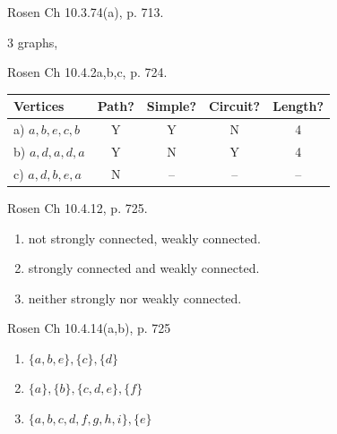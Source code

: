 \begin{questions}
\begin{solution}
    \end{solution}




 Rosen Ch 10.3.74(a), p. 713.
    \ifprintanswers
        \vspace{-10pt}
    \fi
    \begin{solution}
        3 graphs, 
    \end{solution}



 Rosen Ch 10.4.2a,b,c, p. 724.
   \ifprintanswers
        \vspace{-15pt}
   \fi
    \begin{solution}
    \begin{tabular}{lcccc}
        Vertices & Path? & Simple? & Circuit? & Length? \\
        \hline
        a) $a,b,e,c,b$     & Y & Y & N & 4 \\
        b) $a,d,a,d,a$     & Y & N & Y & 4 \\
        c) $a,d,b,e,a$     & N & -- & -- & -- \\
        \hline
    \end{tabular}
    \end{solution}



 Rosen Ch 10.4.12, p. 725.
   \ifprintanswers
        \vspace{-15pt}
   \fi
    \begin{solution}
    \begin{enumerate}[label=(\alph*), topsep=0pt, itemsep=0pt, parsep=0pt]
        \item not strongly connected, weakly connected.
        \item  strongly connected and weakly connected.
        \item  neither strongly nor weakly connected.
    \end{enumerate}
    \end{solution}



 Rosen Ch 10.4.14(a,b), p. 725
    \ifprintanswers
        \vspace{-15pt}
    \fi
    \begin{solution}
    \begin{enumerate}[label=(\alph*), topsep=0pt, itemsep=0pt, parsep=0pt]
        \item  $\{a,b,e\}, \{ c\}, \{d\} $  \hfill
        \item  $ \{a\}, \{b\}, \{c,d,e\}, \{f\} $ \hfill
        \item  $ \{a,b,c,d,f,g,h,i\}, \{e\} $
    \end{enumerate}
    \end{solution}




\end{questions}
